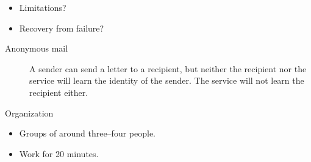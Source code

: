 {\begin{frame}
    \begin{question}
      \begin{itemize}
        \item Limitations?
        \item Recovery from failure?
      \end{itemize}
    \end{question}
  \end{frame}

  \begin{frame}
    \begin{exercise}
      \begin{description}
        \item[Anonymous mail]
          A sender can send a letter to a recipient, but neither the recipient 
          nor the service will learn the identity of the sender.
          The service will not learn the recipient either.
      \end{description}
    \end{exercise}

    \pause

    \begin{block}{Organization}
      \begin{itemize}
        \item Groups of around three--four people.
        \item Work for 20 minutes.
      \end{itemize}
    \end{block}
  \end{frame}
}

